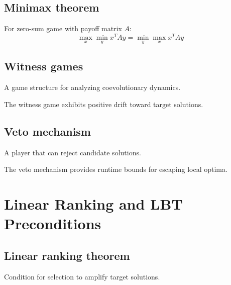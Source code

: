 \section{Minimax theorem}
\begin{theorem}
  \label{thm:minimax}
  For zero-sum game with payoff matrix $A$:
  \[ \max_x \min_y x^T A y = \min_y \max_x x^T A y \]
  \leanok
\end{theorem}

\section{Witness games}
\begin{definition}
  \label{def:witness_game}
  A game structure for analyzing coevolutionary dynamics.
\end{definition}

\begin{lemma}
  \label{lem:witness_drift}
  The witness game exhibits positive drift toward target solutions.
  \leanok
\end{lemma}

\section{Veto mechanism}
\begin{definition}
  \label{def:veto_player}
  A player that can reject candidate solutions.
\end{definition}

\begin{lemma}
  \label{lem:veto_bounds}
  The veto mechanism provides runtime bounds for escaping local optima.
  \leanok
\end{lemma}

\chapter{Linear Ranking and LBT Preconditions}

\section{Linear ranking theorem}
\begin{definition}
  \label{def:precond_G1}
  Condition for selection to amplify target solutions.
\end{definition}

